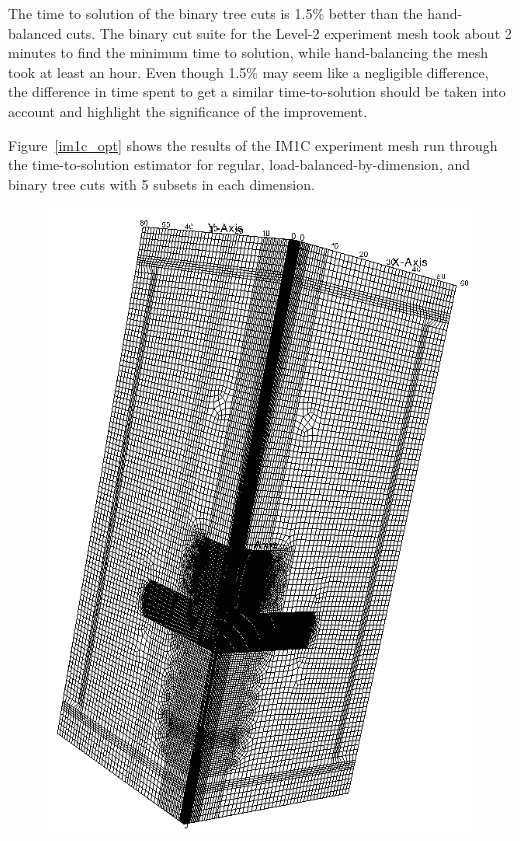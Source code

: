 \documentclass[times,final]{elsarticle}
\begin{document}
The time to solution of the binary tree cuts is 1.5\% better than the hand-balanced cuts.
The binary cut suite for the Level-2 experiment mesh took about 2 minutes to find the minimum time to solution, while hand-balancing the mesh took at least an hour.
Even though 1.5\% may seem like a negligible difference, the difference in time spent to get a similar time-to-solution should be taken into account and highlight the significance of the improvement.

Figure~\ref{im1c_opt} shows the results of the IM1C experiment mesh run through the time-to-solution estimator for regular, load-balanced-by-dimension, and binary tree cuts with 5 subsets in each dimension.
\begin{figure}[ht]
\begin{minipage}[c]{0.65\textwidth}
\centering
\includegraphics[scale=0.3]{../figures/im1_mesh.png}

\end{minipage}
\end{figure}
\end{document}
